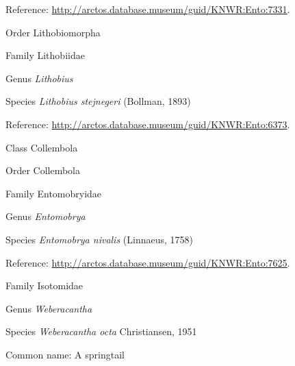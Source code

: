 \documentclass[9pt, article]{memoir}
\begin{document}
\begin{multicols}{2}
Reference: 
\url{http://arctos.database.museum/guid/KNWR:Ento:7331}.

\vspace{6pt}\noindent\hspace{18pt}Order Lithobiomorpha


\vspace{6pt}\noindent\hspace{24pt}Family Lithobiidae


\vspace{6pt}\noindent\hspace{30pt}Genus \textit{Lithobius}


\vspace{6pt}\noindent\hspace{36pt}Species \textit{Lithobius stejnegeri} (Bollman, 1893)


Reference: 
\url{http://arctos.database.museum/guid/KNWR:Ento:6373}.

\vspace{6pt}\noindent\hspace{12pt}Class Collembola


\vspace{6pt}\noindent\hspace{18pt}Order Collembola


\vspace{6pt}\noindent\hspace{24pt}Family Entomobryidae


\vspace{6pt}\noindent\hspace{30pt}Genus \textit{Entomobrya}


\vspace{6pt}\noindent\hspace{36pt}Species \textit{Entomobrya nivalis} (Linnaeus, 1758)


Reference: 
\url{http://arctos.database.museum/guid/KNWR:Ento:7625}.

\vspace{6pt}\noindent\hspace{24pt}Family Isotomidae


\vspace{6pt}\noindent\hspace{30pt}Genus \textit{Weberacantha}


\vspace{6pt}\noindent\hspace{36pt}Species \textit{Weberacantha octa} Christiansen, 1951


Common name: A springtail


\end{multicols}
\end{document}
